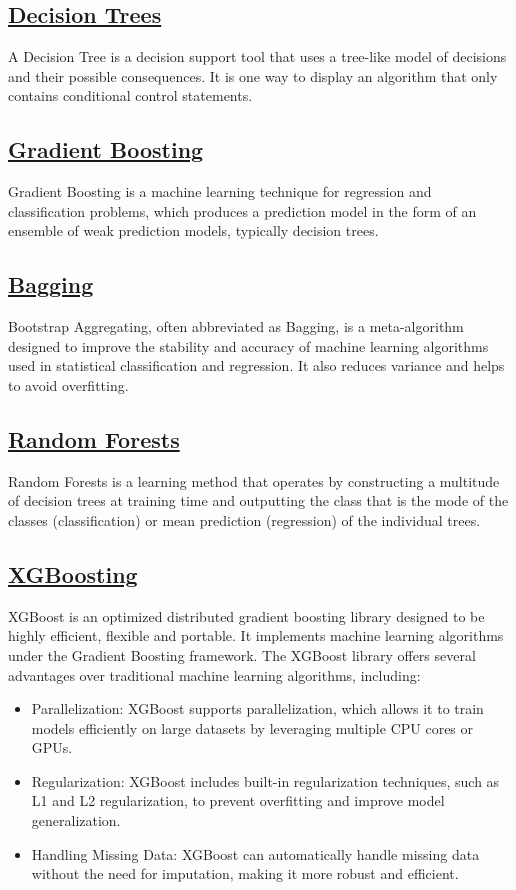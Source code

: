 \documentclass[conference]{IEEEtran}
\begin{document}
    \subsection{\href{https://en.wikipedia.org/wiki/Decision_tree}{Decision Trees}}
    A Decision Tree is a decision support tool that uses a tree-like model of decisions and their possible consequences. It is one way to display an algorithm that only contains conditional control statements.
    \subsection{\href{https://en.wikipedia.org/wiki/Gradient_boosting}{Gradient Boosting}}
    Gradient Boosting is a machine learning technique for regression and classification problems, which produces a prediction model in the form of an ensemble of weak prediction models, typically decision trees.
    \subsection{\href{https://en.wikipedia.org/wiki/Bootstrap_aggregating}{Bagging}}
    Bootstrap Aggregating, often abbreviated as Bagging, is a meta-algorithm designed to improve the stability and accuracy of machine learning algorithms used in statistical classification and regression. It also reduces variance and helps to avoid overfitting.
    \subsection{\href{https://en.wikipedia.org/wiki/Random_forest}{Random Forests}}
    Random Forests is a learning method that operates by constructing a multitude of decision trees at training time and outputting the class that is the mode of the classes (classification) or mean prediction (regression) of the individual trees.

    \subsection{\href{https://en.wikipedia.org/wiki/XGBoost}{XGBoosting}}
    XGBoost is an optimized distributed gradient boosting library designed to be highly efficient, flexible and portable. It implements machine learning algorithms under the Gradient Boosting framework. The XGBoost library offers several advantages over traditional machine learning algorithms, including:
        \begin{itemize}
        \item Parallelization: XGBoost supports parallelization, which allows it to train models efficiently on large datasets by leveraging multiple CPU cores or GPUs.
        \item Regularization: XGBoost includes built-in regularization techniques, such as L1 and L2 regularization, to prevent overfitting and improve model generalization.
        \item Handling Missing Data: XGBoost can automatically handle missing data without the need for imputation, making it more robust and efficient.
        \end{itemize}
\end{document}
